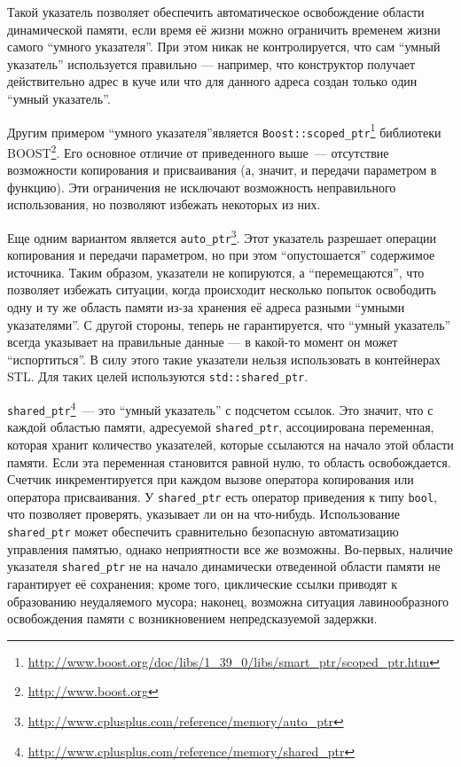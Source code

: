 Такой указатель позволяет обеспечить автоматическое освобождение области динамической памяти, если 
время её жизни можно ограничить временем жизни самого ``умного указателя''. При этом никак не
контролируется, что сам ``умный указатель'' используется правильно --- например, что конструктор
получает действительно адрес в куче или что для данного адреса создан только один ``умный указатель''.

Другим примером ``умного указателя''является \lstinline{Boost::scoped_ptr}\footnote{\url{http://www.boost.org/doc/libs/1\_39\_0/libs/smart\_ptr/scoped\_ptr.htm}} 
библиотеки BOOST\footnote{\url{http://www.boost.org}}. Его основное отличие от приведенного выше~--- отсутствие возможности копирования и присваивания (а,
значит, и передачи параметром в функцию). Эти ограничения не исключают возможность неправильного использования, но позволяют избежать некоторых из них.

Еще одним вариантом является \lstinline{auto_ptr}\footnote{\url{http://www.cplusplus.com/reference/memory/auto\_ptr}}. Этот указатель разрешает
операции копирования и передачи параметром, но при этом ``опустошается'' содержимое источника. Таким образом, указатели не копируются, 
а ``перемещаются'', что позволяет избежать ситуации, когда происходит несколько попыток освободить одну и ту же область памяти из-за хранения 
её адреса разными ``умными указателями''. С другой стороны, теперь не гарантируется, что ``умный указатель'' всегда указывает на правильные данные ---
в какой-то момент он может ``испортиться''. В силу этого такие указатели нельзя использовать в контейнерах STL. Для таких целей используются
\lstinline{std::shared_ptr}.

\lstinline{shared_ptr}\footnote{\url{http://www.cplusplus.com/reference/memory/shared\_ptr}}~--- это ``умный указатель'' с подсчетом ссылок. Это значит, 
что с каждой областью памяти, адресуемой \lstinline{shared_ptr}, ассоциирована переменная, которая хранит количество указателей, которые ссылаются на начало
этой области памяти. Если эта переменная становится равной нулю, то область освобождается. Счетчик инкрементируется при каждом вызове оператора копирования 
или оператора присваивания. У \lstinline{shared_ptr} есть оператор приведения к типу \lstinline{bool}, что позволяет проверять, указывает ли он на что-нибудь.
Использование \lstinline{shared_ptr} может обеспечить сравнительно безопасную автоматизацию управления памятью, однако неприятности все же возможны. Во-первых,
наличие указателя \lstinline{shared_ptr} не на начало динамически отведенной области памяти не гарантирует её сохранения; кроме того, циклические
ссылки приводят к образованию неудаляемого мусора; наконец, возможна ситуация лавинообразного освобождения памяти с возникновением непредсказуемой
задержки.

